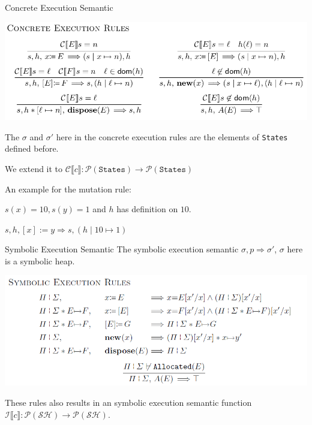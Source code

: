 \documentclass[aspectratio=1610, 13pt]{beamer}
\begin{document}
\begin{frame}{Concrete Execution Semantic}
    \begin{center}
        \includegraphics[scale=0.4]{conc_rules.png}
    \end{center}
    The $\sigma$ and $\sigma'$ here in the concrete execution rules are the elements of \texttt{States} defined before.
    
    We extend it to $\mathcal{C}\llbracket c\rrbracket: \mathcal{P}(\mathtt{States})\rightarrow  \mathcal{P}(\mathtt{States})$
    \begin{example}
    An example for the mutation rule:
    
    $s(x) = 10, s(y) = 1$ and $h$ has definition on $10$.
    
    $s, h, [x] := y \Longrightarrow s, (h\mid 10\mapsto 1)$
    
    \end{example}
\end{frame}

\begin{frame}{Symbolic Execution Semantic}
    The symbolic execution semantic $\sigma,p\Longrightarrow \sigma'$, $\sigma$ here is a symbolic heap.
    \begin{center}
        \includegraphics[scale=0.5]{symb_exec.png}
    \end{center}
    These rules also results in an symbolic execution semantic function $\mathcal{I}\llbracket c\rrbracket: \mathcal{P(SH)\rightarrow P(SH)} $.
\end{frame}
\end{document}
